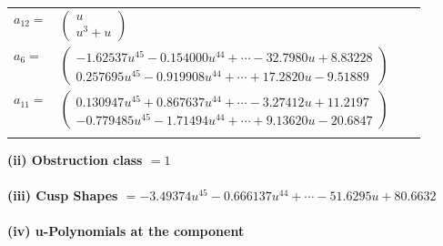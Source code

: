\documentclass[1p]{elsarticle_modified}
\theoremstyle{definition}
\begin{document}
\begin{tabular}{m{7pt} m{180pt} m{7pt} m{180pt} }
\flushright $a_{12}=$&$\begin{pmatrix}u\\u^3+u\end{pmatrix}$ \\
\flushright $a_{6}=$&$\begin{pmatrix}-1.62537 u^{45}-0.154000 u^{44}+\cdots-32.7980 u+8.83228\\0.257695 u^{45}-0.919908 u^{44}+\cdots+17.2820 u-9.51889\end{pmatrix}$ \\
\flushright $a_{11}=$&$\begin{pmatrix}0.130947 u^{45}+0.867637 u^{44}+\cdots-3.27412 u+11.2197\\-0.779485 u^{45}-1.71494 u^{44}+\cdots+9.13620 u-20.6847\end{pmatrix}$\\&\end{tabular}
\flushleft \textbf{(ii) Obstruction class $= 1$}\\~\\
\flushleft \textbf{(iii) Cusp Shapes $= -3.49374 u^{45}-0.666137 u^{44}+\cdots-51.6295 u+80.6632$}\\~\\
\newpage\renewcommand{\arraystretch}{1}
\flushleft \textbf{(iv) u-Polynomials at the component}\newline \\
\end{document}

